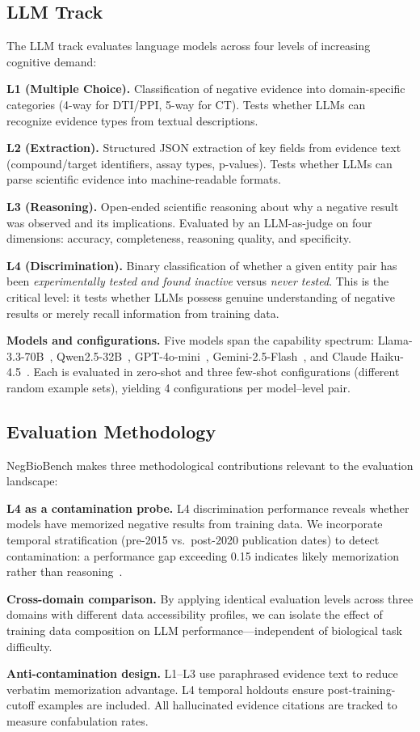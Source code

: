 \subsection{LLM Track}

The LLM track evaluates language models across four levels of increasing cognitive demand:

\textbf{L1 (Multiple Choice).} Classification of negative evidence into domain-specific categories (4-way for DTI/PPI, 5-way for CT). Tests whether LLMs can recognize evidence types from textual descriptions.

\textbf{L2 (Extraction).} Structured JSON extraction of key fields from evidence text (compound/target identifiers, assay types, p-values). Tests whether LLMs can parse scientific evidence into machine-readable formats.

\textbf{L3 (Reasoning).} Open-ended scientific reasoning about why a negative result was observed and its implications. Evaluated by an LLM-as-judge on four dimensions: accuracy, completeness, reasoning quality, and specificity.

\textbf{L4 (Discrimination).} Binary classification of whether a given entity pair has been \emph{experimentally tested and found inactive} versus \emph{never tested}. This is the critical level: it tests whether LLMs possess genuine understanding of negative results or merely recall information from training data.

\textbf{Models and configurations.} Five models span the capability spectrum: Llama-3.3-70B~\citep{dubey2024llama3}, Qwen2.5-32B~\citep{yang2024qwen2}, GPT-4o-mini~\citep{openai2024gpt4o}, Gemini-2.5-Flash~\citep{google2025gemini}, and Claude Haiku-4.5~\citep{anthropic2025claude}. Each is evaluated in zero-shot and three few-shot configurations (different random example sets), yielding 4 configurations per model--level pair.

\subsection{Evaluation Methodology}

NegBioBench makes three methodological contributions relevant to the evaluation landscape:

\textbf{L4 as a contamination probe.} L4 discrimination performance reveals whether models have memorized negative results from training data. We incorporate temporal stratification (pre-2015 vs.\ post-2020 publication dates) to detect contamination: a performance gap exceeding 0.15 indicates likely memorization rather than reasoning~\citep{sainz2024contamination}.

\textbf{Cross-domain comparison.} By applying identical evaluation levels across three domains with different data accessibility profiles, we can isolate the effect of training data composition on LLM performance---independent of biological task difficulty.

\textbf{Anti-contamination design.} L1--L3 use paraphrased evidence text to reduce verbatim memorization advantage. L4 temporal holdouts ensure post-training-cutoff examples are included. All hallucinated evidence citations are tracked to measure confabulation rates.
